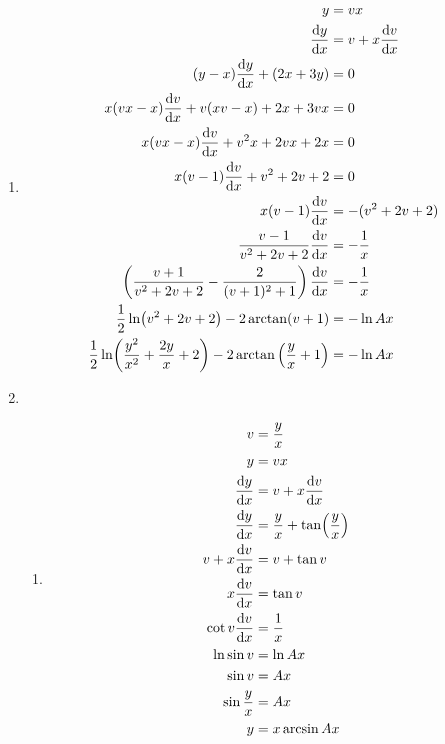 \documentclass[10pt,\jkfside,a4paper]{article}
\begin{document}
\begin{enumerate}
\begin{enumerate}
\end{enumerate}

\item
\begin{equation}
\begin{split}
y &= vx\\
\dv{y}{x} &= v + x\dv{v}{x}\\
(y - x)\dv{y}{x} + (2x + 3y) &= 0\\
x(vx - x)\dv{v}{x} + v(xv - x) + 2x + 3vx &= 0\\
x(vx - x)\dv{v}{x} + v^2x + 2vx + 2x &= 0\\
x(v - 1)\dv{v}{x} + v^2 + 2v + 2 &= 0\\
x(v - 1)\dv{v}{x} &= -(v^2 + 2v + 2)\\
\frac{v - 1}{v^2 + 2v + 2}\dv{v}{x} &= -\frac{1}{x}\\
\left(\frac{v + 1}{v^2 + 2v + 2} - \frac{2}{(v + 1)^2 + 1}\right)\dv{v}{x} &= -\frac{1}{x}\\
\frac{1}{2}\ln(v^2 + 2v + 2) - 2\arctan(v + 1) &= -\ln Ax\\
\frac{1}{2}\ln(\frac{y^2}{x^2} + \frac{2y}{x} + 2) - 2\arctan{\left(\frac{y}{x} + 1\right)} &= - \ln Ax\\
\end{split}
\end{equation}

\item
\begin{enumerate}

\item
\begin{equation}
\begin{split}
v &= \frac{y}{x}\\
y &= vx\\
\dv{y}{x} &= v + x\dv{v}{x}\\
\dv{y}{x} &= \frac{y}{x} + \tan(\frac{y}{x})\\
v + x\dv{v}{x} &= v + \tan{v}\\
x\dv{v}{x} &= \tan{v}\\
\cot{v}\dv{v}{x} &= \frac{1}{x}\\
\ln{\sin{v}} &= \ln{Ax}\\
\sin{v} &= Ax\\
\sin{\frac{y}{x}} &= Ax\\
y &= x\arcsin{Ax}\\
\end{split}
\end{equation}


\end{enumerate}
\end{enumerate}
\end{document}

